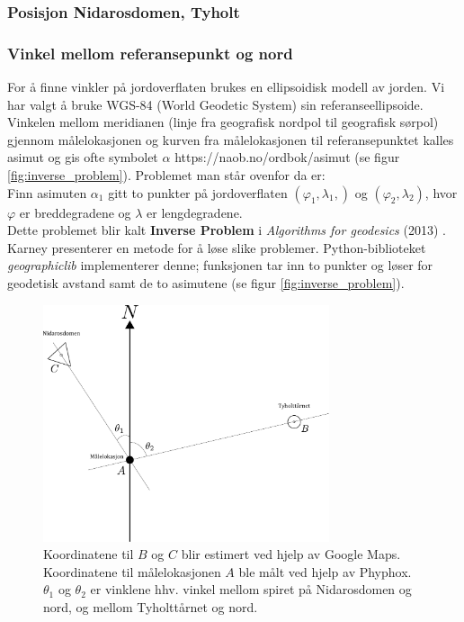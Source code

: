 \subsubsection{Posisjon Nidarosdomen, Tyholt}

\subsubsection{Vinkel mellom referansepunkt og nord}

For å finne vinkler på jordoverflaten brukes en ellipsoidisk modell av jorden.
Vi har valgt å bruke WGS-84 (World Geodetic System) sin referanseellipsoide.
Vinkelen mellom meridianen (linje fra geografisk nordpol til geografisk sørpol) gjennom målelokasjonen og 
kurven fra målelokasjonen til referansepunktet kalles asimut og gis ofte symbolet $\alpha$ {https://naob.no/ordbok/asimut} (se figur \ref{fig:inverse_problem}).
Problemet man står ovenfor da er:
\\

Finn asimuten $\alpha_1$ gitt to punkter på jordoverflaten $(\varphi_1, \lambda_1, )$ og $(\varphi_2, \lambda_2)$, hvor $\varphi$ er breddegradene og $\lambda$ er lengdegradene. 
\\

Dette problemet blir kalt \textbf{Inverse Problem} i \textit{Algorithms for geodesics} (2013) \cite{Karney}. Karney presenterer en metode for å løse slike problemer. Python-biblioteket \textit{geographiclib} implementerer denne; funksjonen  tar inn to punkter og løser for geodetisk avstand samt de to asimutene \cite{geographiclib} (se figur \ref{fig:inverse_problem}).

\begin{figure}
    \centering
    \includegraphics[width=0.75\textwidth]{img/angle_north.pdf}
    \caption{Koordinatene til $B$ og $C$ blir estimert ved hjelp av Google Maps. 
    Koordinatene til målelokasjonen $A$ ble målt ved hjelp av Phyphox.
    $\theta_1$ og $\theta_2$ er vinklene hhv. vinkel mellom spiret på Nidarosdomen og nord, og mellom Tyholttårnet og nord.}
    \label{fig:angle_north}
\end{figure}

